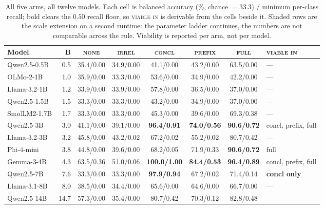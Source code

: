 \documentclass{article}
\begin{document}
\begin{table}[tb]
\centering\small
\caption{All five arms, all twelve models. Each cell is balanced accuracy
(\%, chance $=33.3$) $/$ minimum per-class recall; bold clears the $0.50$ recall
floor, so \textsc{viable in} is derivable from the cells beside it. Shaded rows
are the scale extension on a second runtime: the parameter
ladder continues, the numbers are not comparable across the rule. Viability is
reported per arm, not per model.}
\label{tab:models}
\begin{tabular}{@{}lrccccc@{\hskip 0.9em}l@{}}
\toprule
Model & B & \textsc{none} & \textsc{irrel} & \textsc{concl} & \textsc{prefix} & \textsc{full} & \textsc{viable in} \\
\midrule
Qwen2.5-0.5B &  0.5 & 35.4/0.00 & 34.9/0.00 & 41.1/0.00 & 43.2/0.00 & 63.5/0.00 & --- \\
OLMo-2-1B    &  1.0 & 35.9/0.00 & 33.3/0.00 & 53.6/0.00 & 34.9/0.00 & 42.2/0.00 & --- \\
Llama-3.2-1B &  1.2 & 33.9/0.00 & 33.9/0.00 & 57.8/0.00 & 36.5/0.00 & 37.0/0.00 & --- \\
Qwen2.5-1.5B &  1.5 & 33.3/0.00 & 33.3/0.00 & 43.2/0.00 & 34.9/0.00 & 37.0/0.00 & --- \\
SmolLM2-1.7B &  1.7 & 33.3/0.00 & 33.3/0.00 & 45.3/0.00 & 39.6/0.00 & 69.3/0.38 & --- \\
Qwen2.5-3B   &  3.0 & 41.1/0.00 & 39.1/0.00 & \textbf{96.4/0.91} & \textbf{74.0/0.56} & \textbf{90.6/0.72} & concl, prefix, full \\
Llama-3.2-3B &  3.2 & 45.8/0.00 & 43.2/0.02 & 67.2/0.02 & 55.2/0.02 & 80.7/0.42 & --- \\
Phi-4-mini   &  3.8 & 44.8/0.00 & 39.6/0.00 & 68.2/0.05 & 71.9/0.33 & \textbf{90.6/0.72} & full \\
Gemma-3-4B   &  4.3 & 63.5/0.36 & 51.0/0.06 & \textbf{100.0/1.00} & \textbf{84.4/0.53} & \textbf{96.4/0.89} & concl, prefix, full \\
Qwen2.5-7B   &  7.6 & 33.3/0.00 & 33.3/0.00 & \textbf{97.9/0.94} & 67.2/0.02 & 71.4/0.14 & \textbf{concl only} \\
\midrule
\rowcolor{black!7} Llama-3.1-8B &  8.0 & 38.5/0.00 & 34.4/0.00 & 65.6/0.00 & 64.6/0.00 & 66.7/0.00 & --- \\
\rowcolor{black!7} Qwen2.5-14B  & 14.7 & 57.3/0.00 & 35.4/0.00 & 80.7/0.42 & 70.3/0.12 & 82.8/0.48 & --- \\
\bottomrule
\end{tabular}
\end{table}
\end{document}
